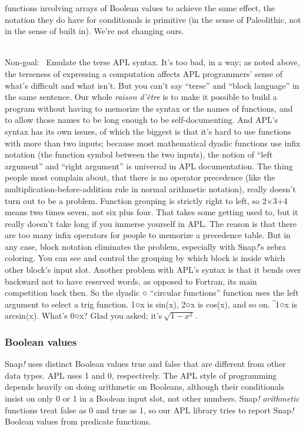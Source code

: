 functions involving arrays of Boolean values to achieve the same effect,
the notation they do have for conditionals is primitive (in the sense of
Paleolithic, not in the sense of built in). We're not changing ours.\\
\strut \\
Non-goal:~ Emulate the terse APL syntax. It's too bad, in a way; as
noted above, the terseness of expressing a computation affects APL
programmers' sense of what's difficult and what isn't. But you can't say
``terse'' and ``block language'' in the same sentence. Our whole
\emph{raison d'être} is to make it possible to build a program without
having to memorize the syntax or the names of functions, and to allow
those names to be long enough to be self-documenting. And APL's syntax
has its own issues, of which the biggest is that it's hard to use
functions with more than two inputs; because most mathematical dyadic
functions use infix notation (the function symbol between the two
inputs), the notion of ``left argument'' and ``right argument'' is
universal in APL documentation. The thing people most complain about,
that there is no operator precedence (like the
multiplication-before-addition rule in normal arithmetic notation),
really doesn't turn out to be a problem. Function grouping is strictly
right to left, so 2×3+4 means two times seven, not six plus four. That
takes some getting used to, but it really doesn't take long if you
immerse yourself in APL. The reason is that there are too many infix
operators for people to memorize a precedence table. But in any case,
block notation eliminates the problem, especially with Snap\emph{!}'s
zebra coloring. You can see and control the grouping by which block is
inside which other block's input slot. Another problem with APL's syntax
is that it bends over backward not to have reserved words, as opposed to
Fortran, its main competition back then. So the dyadic \textbf{○}
``circular functions'' function uses the left argument to select a trig
function. 1\textbf{○}x is sin(x), 2\textbf{○}x is cos(x), and so on.
\textbf{‾}1\textbf{○}x is arcsin(x). What's 0\textbf{○}x? Glad you
asked; it's\(\ \sqrt{1 - x^{2}}\).

\subsubsection{Boolean values}\label{boolean-values}

Snap\emph{!} uses distinct Boolean values true and false that are
different from other data types. APL uses 1 and 0, respectively. The APL
style of programming depends heavily on doing arithmetic on Booleans,
although their conditionals insist on only 0 or 1 in a Boolean input
slot, not other numbers. Snap\emph{!} \emph{arithmetic} functions treat
false as 0 and true as 1, so our APL library tries to report
Snap\emph{!} Boolean values from predicate functions.

